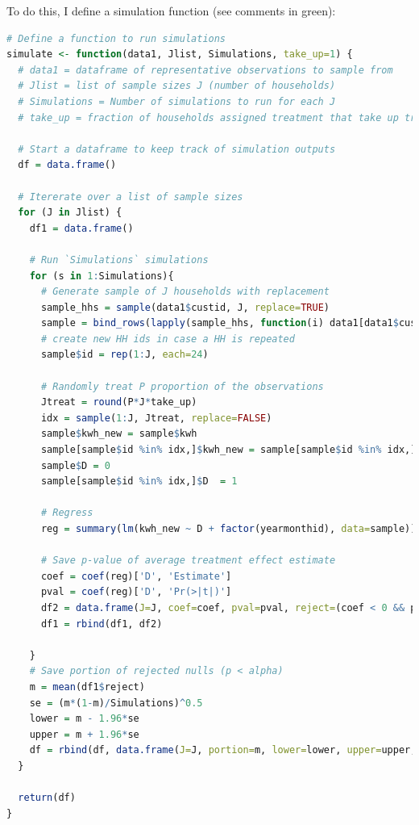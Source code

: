 \documentclass[12pt]{article}
\begin{document}
To do this, I define a simulation function (see comments in green):

\begin{lstlisting}[language=R]
# Define a function to run simulations
simulate <- function(data1, Jlist, Simulations, take_up=1) {
  # data1 = dataframe of representative observations to sample from
  # Jlist = list of sample sizes J (number of households)
  # Simulations = Number of simulations to run for each J
  # take_up = fraction of households assigned treatment that take up treatment
  
  # Start a dataframe to keep track of simulation outputs
  df = data.frame()

  # Itererate over a list of sample sizes
  for (J in Jlist) {
    df1 = data.frame()
    
    # Run `Simulations` simulations
    for (s in 1:Simulations){
      # Generate sample of J households with replacement
      sample_hhs = sample(data1$custid, J, replace=TRUE)
      sample = bind_rows(lapply(sample_hhs, function(i) data1[data1$custid %in% c(i), ]))
      # create new HH ids in case a HH is repeated
      sample$id = rep(1:J, each=24)
      
      # Randomly treat P proportion of the observations
      Jtreat = round(P*J*take_up)
      idx = sample(1:J, Jtreat, replace=FALSE)
      sample$kwh_new = sample$kwh
      sample[sample$id %in% idx,]$kwh_new = sample[sample$id %in% idx,]$kwh*(1 - 0.05)
      sample$D = 0
      sample[sample$id %in% idx,]$D  = 1
      
      # Regress
      reg = summary(lm(kwh_new ~ D + factor(yearmonthid), data=sample))
      
      # Save p-value of average treatment effect estimate
      coef = coef(reg)['D', 'Estimate']
      pval = coef(reg)['D', 'Pr(>|t|)']
      df2 = data.frame(J=J, coef=coef, pval=pval, reject=(coef < 0 && pval <= 0.05))
      df1 = rbind(df1, df2)

    }
    # Save portion of rejected nulls (p < alpha)
    m = mean(df1$reject)
    se = (m*(1-m)/Simulations)^0.5
    lower = m - 1.96*se
    upper = m + 1.96*se
    df = rbind(df, data.frame(J=J, portion=m, lower=lower, upper=upper, simulations=Simulations))
  }
  
  return(df)
}


\end{lstlisting}
\end{document}
